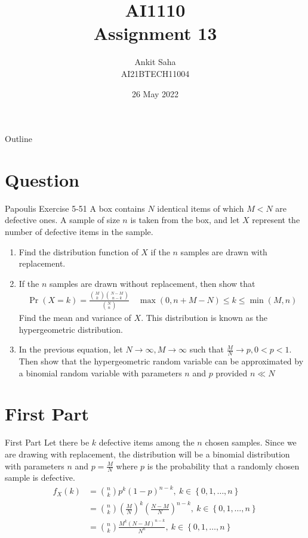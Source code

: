 \documentclass{beamer}
\title{AI1110 \\ Assignment 13}
\author{Ankit Saha \\ AI21BTECH11004}
\date{26 May 2022}
\providecommand{\pr}[1]{\ensuremath{\Pr\left(#1\right)}}
\providecommand{\brak}[1]{\ensuremath{\left(#1\right)}}
\providecommand{\cbrak}[1]{\ensuremath{\left\{#1\right\}}}
\begin{document}
	\begin{frame}
		\titlepage
	\end{frame}
	
	\begin{frame}{Outline}
    		\tableofcontents
	\end{frame}
	
	\section{Question}
	\begin{frame}{Papoulis Exercise 5-51}
	A box contains $N$ identical items of which $M < N$ are defective ones. A sample of size $n$ is taken from the box, and let $X$ represent the number of defective items in the sample.  
	\begin{enumerate}
	\item Find the distribution function of $X$ if the $n$ samples are drawn with replacement.
	\item If the $n$ samples are drawn without replacement, then show that 
	\begin{align}
		\pr{X=k} = \frac{\binom{M}{k} \binom{N-M}{n-k}}{\binom{N}{n}} \quad \max(0, n+M-N) \le k \le \min(M,n)
	\end{align}
	Find the mean and variance of $X$. This distribution is known as the hypergeometric distribution.
	\end{enumerate}
	\end{frame}
	
	\begin{frame}
		\begin{enumerate}
		\setcounter{enumi}{2}
		\item In the previous equation, let $N \to \infty, M \to \infty$ such that $\frac{M}{N} \to p, 0<p<1$. Then show that the hypergeometric random variable can be approximated by a binomial random variable with parameters $n$ and $p$ provided $n \ll N$
		\end{enumerate}
	\end{frame}
	
	\section{First Part}
	\begin{frame}{First Part}
		Let there be $k$ defective items among the $n$ chosen samples. Since we are drawing with replacement, the distribution will be a binomial distribution with parameters $n$ and $p = \frac{M}{N}$ where $p$ is the probability that a randomly chosen sample is defective.
		\begin{align}
			f_X(k) &= \binom{n}{k} p^k (1-p)^{n-k}, ~k \in \cbrak{0,1,\ldots,n} \\
			&= \binom{n}{k} \brak{\frac{M}{N}}^k \brak{\frac{N-M}{N}}^{n-k}, ~k \in \cbrak{0,1,\ldots,n} \\
			&= \binom{n}{k} \frac{M^k (N-M)^{n-k}}{N^n}, ~k \in \cbrak{0,1,\ldots,n}
		\end{align}
	\end{frame}
	
\end{document}

